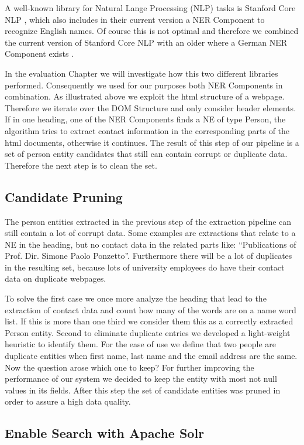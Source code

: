 \documentclass[11pt,titlepage,oneside,openany]{article}
\begin{document}
A well-known library for Natural Lange Processing (NLP) tasks is Stanford Core NLP \cite{manning2014}, which also includes in their current version a NER Component to recognize English names. Of course this is not optimal and therefore we combined the current version of Stanford Core NLP with an older where a German NER Component exists \cite{faruqui10}. 

In the evaluation Chapter we will investigate how this two different libraries performed. 
Consequently we used for our purposes both NER Components in combination. As illustrated above we exploit the html structure of a webpage. Therefore we iterate over the DOM Structure and only consider header elements. If in one heading, one of the NER Components finds a NE of type Person, the algorithm tries to extract contact information in the corresponding parts of the html documents, otherwise it continues.
The result of this step of our pipeline is a set of person entity candidates that still can contain corrupt or duplicate data. Therefore the next step is to clean the set.


\subsection{Candidate Pruning}
The person entities extracted in the previous step of the extraction pipeline can still contain a lot of corrupt data.  Some examples are extractions that relate to a NE in the heading, but no contact data in the related parts like: “Publications of Prof. Dir. Simone Paolo Ponzetto”. Furthermore there will be a lot of duplicates in the resulting set, because lots of university employees do have their contact data on duplicate webpages.

To solve the first case we once more analyze the heading that lead to the extraction of contact data and count how many of the words are on a name word list. If this is more than one third we consider them this as a correctly extracted Person entity. 
Second to eliminate duplicate entries we developed a light-weight heuristic to identify them. For the ease of use we define that two people are duplicate entities when first name, last name and the email address are the same. Now the question arose which one to keep? For further improving the performance of our system we decided to keep the entity with most not null values in its fields.
After this step the set of candidate entities was pruned in order to assure a high data quality.


\subsection{Enable Search with Apache Solr}
\end{document}
